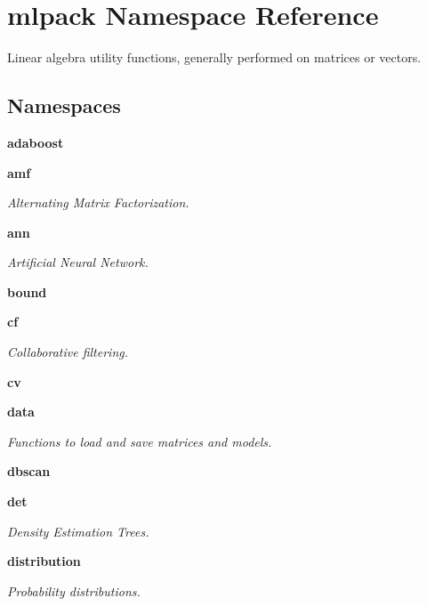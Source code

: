 \section{mlpack Namespace Reference}
\label{namespacemlpack}


Linear algebra utility functions, generally performed on matrices or vectors.  


\subsection*{Namespaces}
\begin{DoxyCompactItemize}
\item 
 \textbf{ adaboost}
\item 
 \textbf{ amf}
\begin{DoxyCompactList}\small\item\em Alternating Matrix Factorization. \end{DoxyCompactList}\item 
 \textbf{ ann}
\begin{DoxyCompactList}\small\item\em Artificial Neural Network. \end{DoxyCompactList}\item 
 \textbf{ bound}
\item 
 \textbf{ cf}
\begin{DoxyCompactList}\small\item\em Collaborative filtering. \end{DoxyCompactList}\item 
 \textbf{ cv}
\item 
 \textbf{ data}
\begin{DoxyCompactList}\small\item\em Functions to load and save matrices and models. \end{DoxyCompactList}\item 
 \textbf{ dbscan}
\item 
 \textbf{ det}
\begin{DoxyCompactList}\small\item\em Density Estimation Trees. \end{DoxyCompactList}\item 
 \textbf{ distribution}
\begin{DoxyCompactList}\small\item\em Probability distributions. \end{DoxyCompactList}\item 

\end{DoxyCompactItemize}
